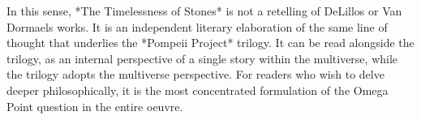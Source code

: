 \documentclass[
  ngerman,
]{article}
\begin{document}
In this sense, *The Timelessness of Stones* is not a retelling of
DeLillo\textquotesingle s or Van Dormael\textquotesingle s works. It is
an independent literary elaboration of the same line of thought that
underlies the *Pompeii Project* trilogy. It can be read alongside the
trilogy, as an internal perspective of a single story within the
multiverse, while the trilogy adopts the multiverse perspective. For
readers who wish to delve deeper philosophically, it is the most
concentrated formulation of the Omega Point question in the entire
oeuvre.
\end{document}
